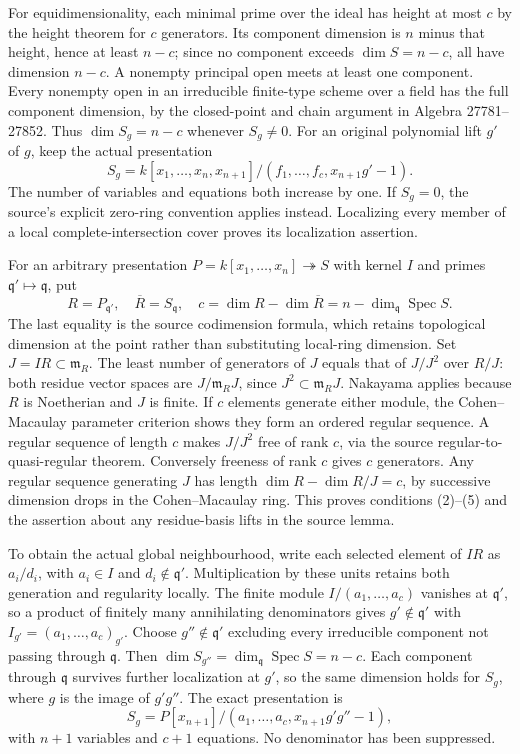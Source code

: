 For equidimensionality, each minimal prime over the ideal has height at most \(c\) by the height theorem for \(c\) generators. Its component dimension is \(n\) minus that height, hence at least \(n-c\); since no component exceeds \(\dim S=n-c\), all have dimension \(n-c\). A nonempty principal open meets at least one component. Every nonempty open in an irreducible finite-type scheme over a field has the full component dimension, by the closed-point and chain argument in Algebra 27781--27852. Thus \(\dim S_g=n-c\) whenever \(S_g\ne0\). For an original polynomial lift \(g'\) of \(g\), keep the actual presentation \[
S_g=k[x_1,\ldots,x_n,x_{n+1}]/(f_1,\ldots,f_c,x_{n+1}g'-1).
\] The number of variables and equations both increase by one. If \(S_g=0\), the source's explicit zero-ring convention applies instead. Localizing every member of a local complete-intersection cover proves its localization assertion.

For an arbitrary presentation \(P=k[x_1,\ldots,x_n]\twoheadrightarrow S\) with kernel \(I\) and primes \(\mathfrak q'\mapsto\mathfrak q\), put \[
R=P_{\mathfrak q'},\quad \overline R=S_{\mathfrak q},\quad
c=\dim R-\dim\overline R=n-\dim_{\mathfrak q}\operatorname{Spec}S.
\] The last equality is the source codimension formula, which retains topological dimension at the point rather than substituting local-ring dimension. Set \(J=IR\subset\mathfrak m_R\). The least number of generators of \(J\) equals that of \(J/J^2\) over \(R/J\): both residue vector spaces are \(J/\mathfrak m_RJ\), since \(J^2\subset\mathfrak m_RJ\). Nakayama applies because \(R\) is Noetherian and \(J\) is finite. If \(c\) elements generate either module, the Cohen--Macaulay parameter criterion shows they form an ordered regular sequence. A regular sequence of length \(c\) makes \(J/J^2\) free of rank \(c\), via the source regular-to-quasi-regular theorem. Conversely freeness of rank \(c\) gives \(c\) generators. Any regular sequence generating \(J\) has length \(\dim R-\dim R/J=c\), by successive dimension drops in the Cohen--Macaulay ring. This proves conditions (2)--(5) and the assertion about any residue-basis lifts in the source lemma.

To obtain the actual global neighbourhood, write each selected element of \(IR\) as \(a_i/d_i\), with \(a_i\in I\) and \(d_i\notin\mathfrak q'\). Multiplication by these units retains both generation and regularity locally. The finite module \(I/(a_1,\ldots,a_c)\) vanishes at \(\mathfrak q'\), so a product of finitely many annihilating denominators gives \(g'\notin\mathfrak q'\) with \(I_{g'}=(a_1,\ldots,a_c)_{g'}\). Choose \(g''\notin\mathfrak q'\) excluding every irreducible component not passing through \(\mathfrak q\). Then \(\dim S_{g''}=\dim_{\mathfrak q}\operatorname{Spec}S=n-c\). Each component through \(\mathfrak q\) survives further localization at \(g'\), so the same dimension holds for \(S_g\), where \(g\) is the image of \(g'g''\). The exact presentation is \[
S_g=P[x_{n+1}]/(a_1,\ldots,a_c,x_{n+1}g'g''-1),
\] with \(n+1\) variables and \(c+1\) equations. No denominator has been suppressed.

